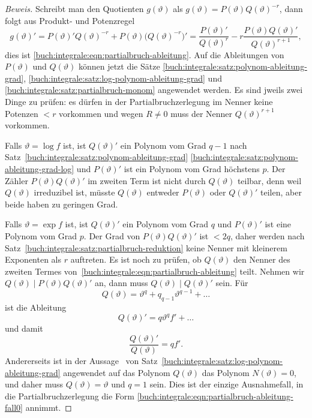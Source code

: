 \begin{proof}[Beweis]
Schreibt man den Quotienten $g(\vartheta)$ als
$g(\vartheta)=P(\vartheta)Q(\vartheta)^{-r}$, dann folgt aus
Produkt- und Potenzregel
\[
g(\vartheta)'
=
P(\vartheta)'Q(\vartheta)^{-r}
+
P(\vartheta)\bigl(Q(\vartheta)^{-r}\bigr)'
=
\frac{P(\vartheta)'}{Q(\vartheta)^{r}}
-r\frac{P(\vartheta)Q(\vartheta)'}{Q(\vartheta)^{r+1}},
\]
dies ist
\eqref{buch:integrale:eqn:partialbruch-ableitung}.
Auf die Ableitungen von $P(\vartheta)$ und $Q(\vartheta)$ können 
jetzt die Sätze
\ref{buch:integrale:satz:polynom-ableitung-grad},
\ref{buch:integrale:satz:log-polynom-ableitung-grad}
und
\ref{buch:integrale:satz:partialbruch-monom}
angewendet werden.
Es sind jweils zwei Dinge zu prüfen: es dürfen in der Partialbruchzerlegung
im Nenner keine Potenzen $<r$ vorkommen und wegen $R\ne 0$ muss der Nenner
$Q(\vartheta)^{r+1}$ vorkommen.

Falls $\vartheta=\log f$ ist, ist $Q(\vartheta)'$ ein Polynom vom
Grad $q-1$ nach Satz~\eqref{buch:integrale:satz:polynom-ableitung-grad}
\ref{buch:integrale:satz:polynom-ableitung-grad-log}
und $P(\vartheta)'$ ist ein Polynom vom Grad höchstens $p$.
Der Zähler $P(\vartheta)Q(\vartheta)'$ im zweiten Term ist nicht
durch $Q(\vartheta)$ teilbar, denn weil $Q(\vartheta)$ irreduzibel
ist, müsste $Q(\vartheta)$ entweder $P(\vartheta)$ oder $Q(\vartheta)'$
teilen, aber beide haben zu geringen Grad.

Falls $\vartheta=\exp f$ ist, ist $Q(\vartheta)'$ ein Polynom vom
Grad $q$ und $P(\vartheta)'$ ist eine Polynom vom Grad $p$.
Der Grad von $P(\vartheta)Q(\vartheta)'$ ist $<2q$, daher 
werden nach
Satz~\ref{buch:integrale:satz:partialbruch-reduktion}
keine Nenner mit kleinerem Exponenten als $r$ auftreten.
Es ist noch zu prüfen, ob $Q(\vartheta)$ den Nenner des zweiten Termes
von~\eqref{buch:integrale:eqn:partialbruch-ableitung} teilt.
Nehmen wir $Q(\vartheta)\mid P(\vartheta)Q(\vartheta)'$ an, dann muss
$Q(\vartheta)\mid Q(\vartheta)'$ sein.
Für
\[
Q(\vartheta) = \vartheta^q + q_{q-1}\vartheta^{q-1} + \dots
\]
ist die Ableitung
\[
Q(\vartheta)'
=
q\vartheta^q f'
+
\dots
\]
und damit
\[
\frac{Q(\vartheta)'}{Q(\vartheta)}
=
qf'.
\]
Andererseits ist in der 
Aussage~\label{buch:integrale:satz:log-polynom-ableitung-exp}
von
Satz~\ref{buch:integrale:satz:log-polynom-ableitung-grad}
angewendet auf das Polynom $Q(\vartheta)$ das Polynom $N(\vartheta)=0$,
und daher muss $Q(\vartheta)=\vartheta$ und $q=1$ sein.
Dies ist der einzige Ausnahmefall, in die Partialbruchzerlegung die Form
\eqref{buch:integrale:eqn:partialbruch-ableitung-fall0}
annimmt.
\end{proof}

